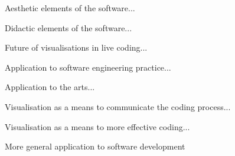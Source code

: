 


Aesthetic elements of the software...

Didactic elements of the software...

Future of visualisations in live coding...

Application to software engineering practice...

Application to the arts...

Visualisation as a means to communicate the coding process...

Visualisation as a means to more effective coding...

More general application to software development


